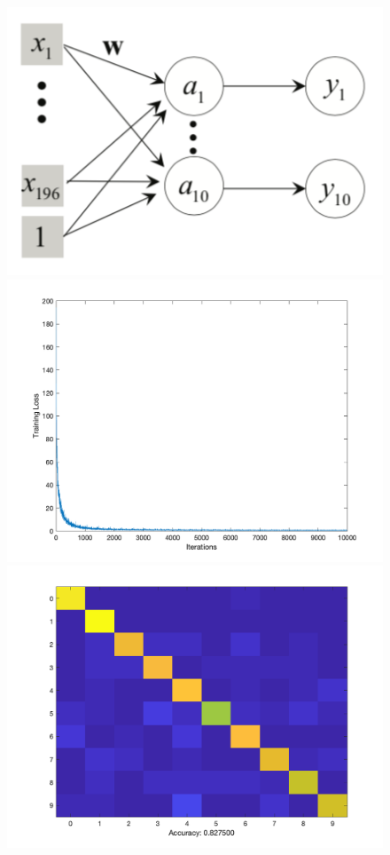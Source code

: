 \documentclass[letter, 10pt]{article}
\begin{document}
\begin{figure}[H]
        \centering
        \includegraphics[width=\textwidth]{HW4/RESULT/SLP_linear.png}
    \endminipage\hfill
        \centering
        \includegraphics[width=1.1\textwidth]{HW4/RESULT/SLP_linear_loss.png}
    \endminipage\hfill
        \centering
        \includegraphics[width=1.1\textwidth]{HW4/RESULT/SLPLINEAR_CONFUSION.png}

\end{figure}
\end{document}
